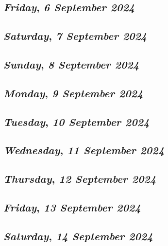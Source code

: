 \def\day{\textit{6 September 2024}}
\def\weekday{\textit{Friday}}
\subsection*{\weekday, \day}

\def\day{\textit{7 September 2024}}
\def\weekday{\textit{Saturday}}
\subsection*{\weekday, \day}

\def\day{\textit{8 September 2024}}
\def\weekday{\textit{Sunday}}
\subsection*{\weekday, \day}

\def\day{\textit{9 September 2024}}
\def\weekday{\textit{Monday}}
\subsection*{\weekday, \day}

\def\day{\textit{10 September 2024}}
\def\weekday{\textit{Tuesday}}
\subsection*{\weekday, \day}

\def\day{\textit{11 September 2024}}
\def\weekday{\textit{Wednesday}}
\subsection*{\weekday, \day}

\def\day{\textit{12 September 2024}}
\def\weekday{\textit{Thursday}}
\subsection*{\weekday, \day}

\def\day{\textit{13 September 2024}}
\def\weekday{\textit{Friday}}
\subsection*{\weekday, \day}

\def\day{\textit{14 September 2024}}
\def\weekday{\textit{Saturday}}
\subsection*{\weekday, \day}

